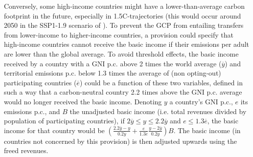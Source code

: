 \documentclass[12pt,english]{article}
\begin{document}
Conversely, some high-income countries might have a lower-than-average carbon footprint in the future, especially in 1.5\textdegree{}C-trajectories (this would occur around 2050 in the SSP1-1.9 scenario of \citealp{van_vuuren_energy_2017}). To prevent the GCP from entailing transfers from lower-income to higher-income countries, a provision could specify that high-income countries cannot receive the basic income if their emissions per adult are lower than the global average. To avoid threshold effects, the basic income received by a country with a GNI p.c. above 2 times the world average ($\overline{y}$) and territorial emissions p.c. below 1.3 times the average of (non opting-out) participating countries ($\overline{e}$) could be a function of these two variables, defined in such a way that a carbon-neutral country 2.2 times above the GNI p.c. average would no longer received the basic income. Denoting $y$ a country's GNI p.c., $e$ its emissions p.c., and $B$ the unadjusted basic income (i.e. total revenues divided by population of participating countries), if $2\overline{y}\leq y\leq 2.2\overline{y}$ and $e \leq 1.3 \overline{e}$, the basic income for that country would be $\left( \frac{2.2\overline{y}-y}{0.2\overline{y}} + \frac{e}{1.3\overline{e}} \frac{y-2\overline{y}}{0.2\overline{y}} \right) B$. The basic income (in countries not concerned by this provision) is then adjusted upwards using the freed revenues.


\end{document}
